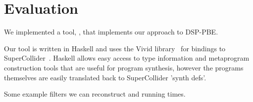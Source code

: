 \section{Evaluation}

We implemented a tool, \ourTool, that implements our approach to DSP-PBE.

Our tool is written in Haskell and uses the Vivid library~\cite{vivid} for bindings to SuperCollider~\cite{SC}.
Haskell allows easy access to type information and metaprogram construction tools that are useful for program synthesis, however the programs themselves are easily translated back to SuperCollider 'synth defs'.

Some example filters we can reconstruct and running times.

